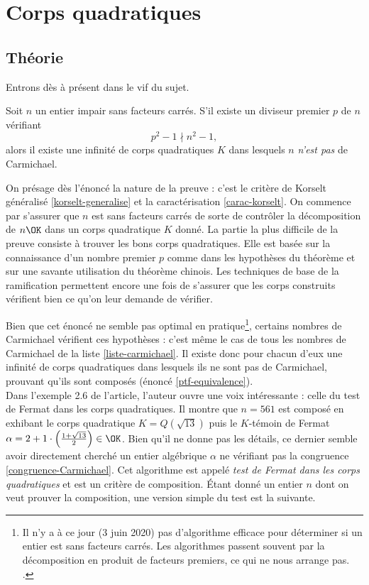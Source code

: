 \section{Corps quadratiques}

\subsection{Théorie}

Entrons dès à présent dans le vif du sujet. 

\begin{theoreme}\label{theoreme-2.5}
	Soit $n$ un entier impair sans facteurs carrés. S'il existe un diviseur premier $p$ de $n$ vérifiant $$p^2 - 1 \nmid n^2 - 1,$$ alors il existe une infinité de corps quadratiques $K$ dans lesquels $n$ \emph{n'est pas} de Carmichael.
\end{theoreme}

\begin{MotSurPreuve}
	On présage dès l'énoncé la nature de la preuve : c'est le critère de Korselt généralisé \ref{korselt-generalise} et la caractérisation \ref{carac-korselt}. On commence par s'assurer que $n$ est sans facteurs carrés de sorte de contrôler la décomposition de $n\OK$ dans un corps quadratique $K$ donné. La partie la plus difficile de la preuve consiste à trouver les bons corps quadratiques. Elle est basée sur la connaissance d'un nombre premier $p$ comme dans les hypothèses du théorème et sur une savante utilisation du théorème chinois. Les techniques de base de la ramification permettent encore une fois de s'assurer que les corps construits vérifient bien ce qu'on leur demande de vérifier. \\
\end{MotSurPreuve}

Bien que cet énoncé ne semble pas optimal en pratique\footnote{Il n'y a à ce jour (3 juin 2020) pas d'algorithme efficace pour déterminer si un entier est sans facteurs carrés. Les algorithmes passent souvent par la décomposition en produit de facteurs premiers, ce qui ne nous arrange pas. .}, certains nombres de Carmichael vérifient ces hypothèses : c'est même le cas de tous les nombres de Carmichael de la liste \ref{liste-carmichael}. Il existe donc pour chacun d'eux une infinité de corps quadratiques dans lesquels ils ne sont pas de Carmichael, prouvant qu'ils sont composés (énoncé \ref{ptf-equivalence}). \\

Dans l'exemple 2.6 de l'article, l'auteur ouvre une voix intéressante : celle du test de Fermat dans les corps quadratiques. Il montre que $n = 561$ est composé en exhibant le corps quadratique $K = Q(\sqrt{13})$ puis le $K$-témoin de Fermat $\alpha = 2 + 1\cdot \left(\frac{1 + \sqrt{13}}{2}\right) \in \OK$. Bien qu'il ne donne pas les détails, ce dernier semble avoir directement cherché un entier algébrique $\alpha$ ne vérifiant pas la congruence \ref{congruence-Carmichael}. Cet algorithme est appelé \emph{test de Fermat dans les corps quadratiques} et est un critère de composition. Étant donné un entier $n$ dont on veut prouver la composition, une version simple du test est la suivante.

